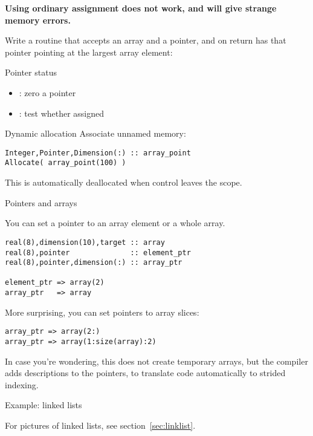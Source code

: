 \textbf{Using ordinary assignment does not work, and will give strange
  memory errors.}

\begin{exercise}
  \label{ex:fpoint-fun}
  Write a routine that accepts an array and a pointer, and on return
  has that pointer pointing at the largest array element:
\end{exercise}

\begin{block}{Pointer status}
  \label{sl:fpoint-stat}
  \begin{itemize}
  \item {}: zero a pointer
  \item {}: test whether assigned
  \end{itemize}  
\end{block}

\begin{block}{Dynamic allocation}
  \label{sl:fpoint-dynamic}
  Associate unnamed memory:
\begin{lstlisting}
Integer,Pointer,Dimension(:) :: array_point
Allocate( array_point(100) )
\end{lstlisting}  
This is automatically deallocated when control leaves the scope.
\end{block}

 {Pointers and arrays}

You can set a pointer to an array element or a whole array.
\begin{lstlisting}
real(8),dimension(10),target :: array
real(8),pointer              :: element_ptr
real(8),pointer,dimension(:) :: array_ptr

element_ptr => array(2)
array_ptr   => array
\end{lstlisting}
More surprising, you can set pointers to array slices:
\begin{lstlisting}
array_ptr => array(2:)
array_ptr => array(1:size(array):2)
\end{lstlisting}

In case you're wondering, this does not create temporary arrays, but
the compiler adds descriptions to the pointers, to translate code
automatically to strided indexing.

 {Example: linked lists}

For pictures of linked lists, see section~\ref{sec:linklist}.

